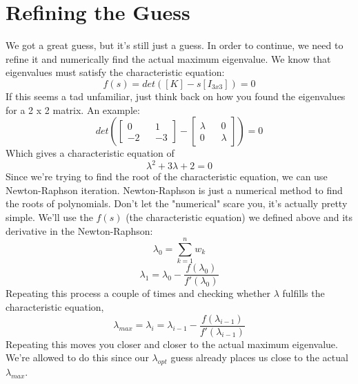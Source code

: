 \documentclass[a4paper,14pt]{extreport}
\begin{document}
\section{Refining the Guess}
We got a great guess, but it's still just a guess. In order to continue, we need to refine it and numerically find the actual maximum eigenvalue. We know that eigenvalues must satisfy the characteristic equation:
\[
f(s) = det([K]-s[I_{3x3}]) = 0
\]
If this seems a tad unfamiliar, just think back on how you found the eigenvalues for a 2 x 2 matrix. An example:
\[
det(
\begin{bmatrix}
0&&1\\-2&&-3
\end{bmatrix} - 
\begin{bmatrix}
\lambda&&0\\0&&\lambda
\end{bmatrix}) = 0
\]
Which gives a characteristic equation of
\[
\lambda^2+3\lambda+2=0
\]
Since we're trying to find the root of the characteristic equation, we can use Newton-Raphson iteration. Newton-Raphson is just a numerical method to find the roots of polynomials. Don't let the "numerical" scare you, it's actually pretty simple. We'll use the $f(s)$  (the characteristic equation) we defined above and its derivative in the Newton-Raphson:
\[
\lambda_0 = \sum^n_{k=1} w_k
\]
\[
\lambda_1 = \lambda_0 - \dfrac{f(\lambda_0)}{f'(\lambda_0)}
\]
Repeating this process a couple of times and checking whether $\lambda$ fulfills the characteristic equation,
\[
\lambda_{max} = \lambda_i = \lambda_{i-1} - \dfrac{f(\lambda_{i-1})}{f'(\lambda_{i-1})}
\]
Repeating this moves you closer and closer to the actual maximum eigenvalue. We're allowed to do this since our $\lambda_{opt}$ guess already places us close to the actual $\lambda_{max}$.
\end{document}
